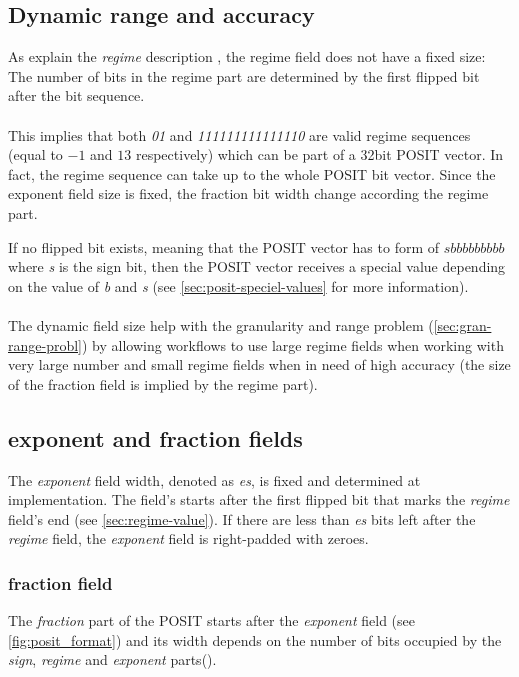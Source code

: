 \documentclass[10pt]{article}
\begin{document}
\subsection{Dynamic range and accuracy}\label{sec:dynam-range-accur}

As explain the \textit{regime} description , the regime
field does not have a fixed size: The number of bits in the regime part are
determined by the first flipped bit after the bit sequence. \\\\
This implies that both \textit{01} and \textit{111111111111110} are valid regime sequences
(equal to $-1$ and $13$ respectively) which can be part of a 32bit POSIT vector.
In fact, the regime sequence can take up to the whole POSIT bit vector.
Since the exponent field size is fixed, the fraction bit width change according
the regime part.

If no flipped bit exists, meaning that the POSIT vector has to form of
\textit{$sbbbbbbbbb$} where \textit{s} is the sign bit, then the POSIT vector
receives a special value depending on the value of \textit{b} and \textit{s}
(see \autoref{sec:posit-speciel-values} for more information).

\paragraph{}
The dynamic field size help with the granularity and range problem
(\ref{sec:gran-range-probl}) by allowing workflows to use large regime
fields when working with very large number and small regime fields when in need
of high accuracy (the size of the fraction field is implied by the regime part).

\subsection{exponent and fraction fields}\label{sec:expon-fract-fields}

The \textit{exponent} field width, denoted as \textit{es}, is fixed and determined at
implementation. The field's starts after the first flipped bit that marks the
\textit{regime} field's end (see \autoref{sec:regime-value}). If there are less
than \textit{es} bits left after the \textit{regime} field, the
\textit{exponent} field is right-padded with zeroes.


\subsubsection{fraction field}\label{sec:fraction-field}
The \textit{fraction} part of the POSIT starts after the \textit{exponent} field
(see \autoref{fig:posit_format}) and its width depends on the number of bits
occupied by the \textit{sign}, \textit{regime} and \textit{exponent}
parts().
\end{document}
